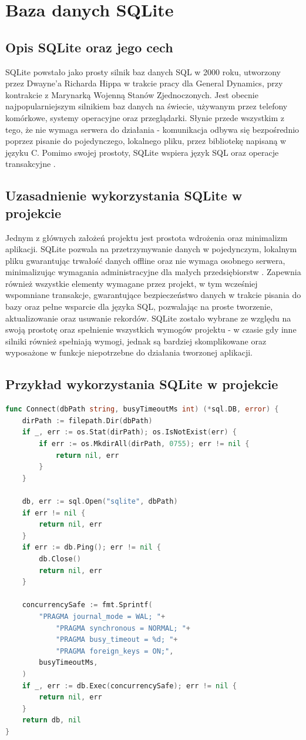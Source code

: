 \section{Baza danych SQLite}
\subsection{Opis SQLite oraz jego cech}
SQLite powstało jako prosty silnik baz danych SQL w 2000 roku, utworzony przez Dwayne'a Richarda Hippa w trakcie pracy dla General Dynamics, przy kontrakcie z Marynarką Wojenną Stanów Zjednoczonych. Jest obecnie najpopularniejszym silnikiem baz danych na świecie, używanym przez telefony komórkowe, systemy operacyjne oraz przeglądarki. Słynie przede wszystkim z tego, że nie wymaga serwera do działania - komunikacja odbywa się bezpośrednio poprzez pisanie do pojedynczego, lokalnego pliku, przez bibliotekę napisaną w języku C. Pomimo swojej prostoty, SQLite wspiera język SQL oraz operacje transakcyjne \parencite{sqlite_about}. 

\subsection{Uzasadnienie wykorzystania SQLite w projekcie}
Jednym z głównych założeń projektu jest prostota wdrożenia oraz minimalizm aplikacji. SQLite pozwala na przetrzymywanie danych w pojedynczym, lokalnym pliku gwarantując trwałość danych offline oraz nie wymaga osobnego serwera, minimalizując wymagania administracyjne dla małych przedsiębiorstw \parencite{sqlite_about}. Zapewnia również wszystkie elementy wymagane przez projekt, w tym wcześniej wspomniane transakcje, gwarantujące bezpieczeństwo danych w trakcie pisania do bazy oraz pełne wsparcie dla języka SQL, pozwalając na proste tworzenie, aktualizowanie oraz usuwanie rekordów. SQLite zostało wybrane ze względu na swoją prostotę oraz spełnienie wszystkich wymogów projektu - w czasie gdy inne silniki również spełniają wymogi, jednak są bardziej skomplikowane oraz wyposażone w funkcje niepotrzebne do działania tworzonej aplikacji.

\subsection{Przykład wykorzystania SQLite w projekcie}
\begin{lstlisting}[style=thesiscode, language=Go, caption={Przykład połączenia z bazą SQLite}, label={lst:sqlite-connect}]
func Connect(dbPath string, busyTimeoutMs int) (*sql.DB, error) {
	dirPath := filepath.Dir(dbPath)
	if _, err := os.Stat(dirPath); os.IsNotExist(err) {
		if err := os.MkdirAll(dirPath, 0755); err != nil {
			return nil, err
		}
	}

	db, err := sql.Open("sqlite", dbPath)
	if err != nil {
		return nil, err
	}
	if err := db.Ping(); err != nil {
		db.Close()
		return nil, err
	}

	concurrencySafe := fmt.Sprintf(
		"PRAGMA journal_mode = WAL; "+
			"PRAGMA synchronous = NORMAL; "+
			"PRAGMA busy_timeout = %d; "+
			"PRAGMA foreign_keys = ON;",
		busyTimeoutMs,
	)
	if _, err := db.Exec(concurrencySafe); err != nil {
		return nil, err
	}
	return db, nil
}
\end{lstlisting}

